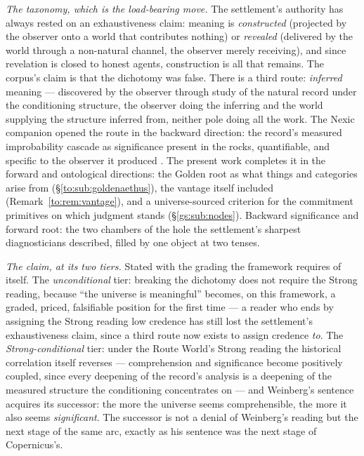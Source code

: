 \documentclass[11pt]{article}
\numberwithin{equation}{section}
\theoremstyle{plain}
\theoremstyle{definition}
\theoremstyle{remark}
\begin{document}
\emph{The taxonomy, which is the load-bearing move.} The settlement's
authority has always rested on an exhaustiveness claim: meaning is
\emph{constructed} (projected by the observer onto a world that
contributes nothing) or \emph{revealed} (delivered by the world
through a non-natural channel, the observer merely receiving), and
since revelation is closed to honest agents, construction is all that
remains. The corpus's claim is that the dichotomy was false. There is
a third route: \emph{inferred} meaning --- discovered by the observer
through study of the natural record under the conditioning structure,
the observer doing the inferring and the world supplying the
structure inferred from, neither pole doing all the work. The Nexic
companion opened the route in the backward direction: the record's
measured improbability cascade as significance present in the rocks,
quantifiable, and specific to the observer it produced \cite{Nexus}.
The present work completes it in the forward and ontological
directions: the Golden root as what things and categories arise from
(\S\ref{to:sub:goldenaethus}), the vantage itself included
(Remark~\ref{to:rem:vantage}), and a universe-sourced criterion for
the commitment primitives on which judgment stands
(\S\ref{gs:sub:nodes}). Backward significance and forward root: the
two chambers of the hole the settlement's sharpest diagnosticians
described, filled by one object at two tenses.

\emph{The claim, at its two tiers.} Stated with the grading the
framework requires of itself. The \emph{unconditional} tier: breaking
the dichotomy does not require the Strong reading, because ``the
universe is meaningful'' becomes, on this framework, a graded,
priced, falsifiable position for the first time --- a reader who ends
by assigning the Strong reading low credence has still lost the
settlement's exhaustiveness claim, since a third route now exists to
assign credence \emph{to}. The \emph{Strong-conditional} tier: under
the Route World's Strong reading the historical correlation itself
reverses --- comprehension and significance become positively
coupled, since every deepening of the record's analysis is a
deepening of the measured structure the conditioning concentrates on
--- and Weinberg's sentence acquires its successor: the more the
universe seems comprehensible, the more it also seems
\emph{significant}. The successor is not a denial of Weinberg's
reading but the next stage of the same arc, exactly as his sentence
was the next stage of Copernicus's.
\end{document}
